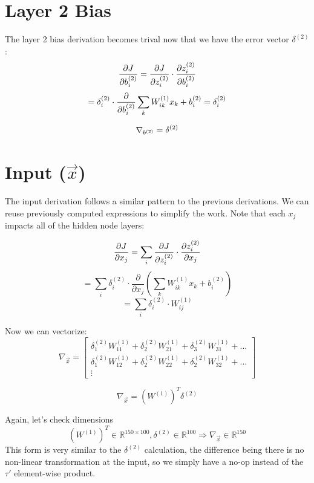 \documentclass[]{article}
\newcommand{\deriv}[2]{%
	\ensuremath{\frac{\partial {#1}}{\partial {#2}}}}
\newcommand{\slayer}[3]{ %
	\ensuremath{{#1}^{(#2)}_{#3}}}
\newcommand{\vlayer}[2]{ %
	\ensuremath{{#1}^{(#2)}}}
\newcommand{\reals}[1]{ %
	\ensuremath{\in \mathbb{R}^{#1}}}
\begin{document}
\section{Layer 2 Bias}
The layer 2 bias derivation becomes trival now that we have the error vector\vlayer{\delta}{2}:
$$\deriv{J}{\slayer{b}{2}{i}} = \deriv{J}{\slayer{z}{2}{i}} \cdot \deriv{\slayer{z}{2}{i}}{\slayer{b}{2}{i}}$$
$$ = \slayer{\delta}{2}{i} \cdot \deriv{}{\slayer{b}{2}{i}}\sum_k \slayer{W}{1}{ik}x_k + \slayer{b}{2}{i} = \slayer{\delta}{2}{i}$$

\begin{equation}\label{eq:b2}
	\nabla_{\vlayer{b}{2}} = \vlayer{\delta}{2}
\end{equation}

\section{ Input ($\vec{x}$)}
The input derivation follows a similar pattern to the previous derivations. We can reuse previously computed expressions to simplify the work. Note that each $x_j$ impacts all of the hidden node layers:

$$\deriv{J}{x_j} = \sum_i\deriv{J}{\slayer{z}{2}{i}} \cdot \deriv{\slayer{z}{2}{i}}{x_j}$$
$$ = \sum_i \slayer{\delta}{2}{i} \cdot \deriv{}{x_j} \left( \sum_k \slayer{W}{1}{ik}x_k + \slayer{b}{2}{i} \right)$$
$$ = \sum_i \slayer{\delta}{2}{i} \cdot \slayer{W}{1}{ij}$$

Now we can vectorize:
\[
\nabla_{\vec{x}} = 
\begin{bmatrix}
\slayer{\delta}{2}{1}\slayer{W}{1}{11} + \slayer{\delta}{2}{2}\slayer{W}{1}{21} + \slayer{\delta}{2}{3}\slayer{W}{1}{31} + ...  \\
\slayer{\delta}{2}{1}\slayer{W}{1}{12} + \slayer{\delta}{2}{2}\slayer{W}{1}{22} + \slayer{\delta}{2}{2}\slayer{W}{1}{32} + ...  \\
\vdots 
\end{bmatrix}
\]

\begin{equation}\label{eq:x}
	\nabla_{\vec{x}} = (\vlayer{W}{1})^T\vlayer{\delta}{2}	
\end{equation}

Again, let's check dimensions
$$(\vlayer{W}{1})^T\reals{150\times100}, \vlayer{\delta}{2}\reals{100} \Rightarrow \nabla_{\vec{x}}\reals{150}$$
This form is very similar to the\vlayer{\delta}{2} calculation, the difference being there is no non-linear transformation at the input, so we simply have a no-op instead of the $\tau'$ element-wise product.
\end{document}
